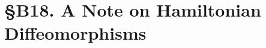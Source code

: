 
\chapter*{\S B18. A Note on Hamiltonian Diffeomorphisms}
\setcounter{footnote}{0}


\begin{abstract}
  We describe the group $\Ham(X\omega)$,
  of Hamiltonian transformations of a parasymplectic space $(X\omega)$,
  as the kernel of a morphism into the product of the tori of periods of the elements of the holonomy groups.
\end{abstract}


